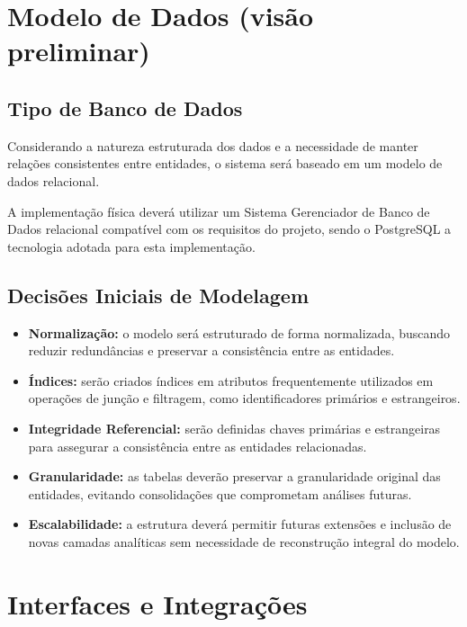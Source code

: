 \documentclass[12pt,a4paper]{article}
\begin{document}
\section{Modelo de Dados (visão preliminar)}

\subsection{Tipo de Banco de Dados}

Considerando a natureza estruturada dos dados e a necessidade de manter relações consistentes entre entidades, o sistema será baseado em um modelo de dados relacional.

A implementação física deverá utilizar um Sistema Gerenciador de Banco de Dados relacional compatível com os requisitos do projeto, sendo o PostgreSQL a tecnologia adotada para esta implementação.

\subsection{Decisões Iniciais de Modelagem}

\begin{itemize}
    \item \textbf{Normalização:} o modelo será estruturado de forma normalizada, buscando reduzir redundâncias e preservar a consistência entre as entidades.

    \item \textbf{Índices:} serão criados índices em atributos frequentemente utilizados em operações de junção e filtragem, como identificadores primários e estrangeiros.

    \item \textbf{Integridade Referencial:} serão definidas chaves primárias e estrangeiras para assegurar a consistência entre as entidades relacionadas.

    \item \textbf{Granularidade:} as tabelas deverão preservar a granularidade original das entidades, evitando consolidações que comprometam análises futuras.

    \item \textbf{Escalabilidade:} a estrutura deverá permitir futuras extensões e inclusão de novas camadas analíticas sem necessidade de reconstrução integral do modelo.
\end{itemize}

\section{Interfaces e Integrações}
\end{document}
